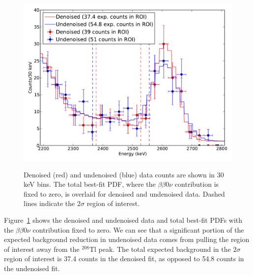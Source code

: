 \begin{figure}
\begin{center}
\includegraphics[keepaspectratio=true,width=\textwidth]{DenoisedVsUndenoised_TotalPdfsWithData.pdf}
\end{center}
\renewcommand{\baselinestretch}{1}
\small\normalsize
\begin{quote}
\caption{Denoised (red) and undenoised (blue) data counts are shown in 30 keV bins.  The total best-fit PDF, where the $\beta\beta 0\nu$ contribution is fixed to zero, is overlaid for denoised and undenoised data.  Dashed lines indicate the $2\sigma$ region of interest.}
\label{fig:DenoisedComparison_DataTotalPdf}
\end{quote}
\end{figure}
\renewcommand{\baselinestretch}{2}
\small\normalsize

Figure~\ref{fig:DenoisedComparison_DataTotalPdf} shows the denoised and undenoised data and total best-fit PDFs with the $\beta\beta 0\nu$ contribution fixed to zero.  We can see that a significant portion of the expected background reduction in undenoised data comes from pulling the region of interest away from the $^{208}$Tl peak.  The total expected background in the $2\sigma$ region of interest is 37.4 counts in the denoised fit, as opposed to 54.8 counts in the undenoised fit.

